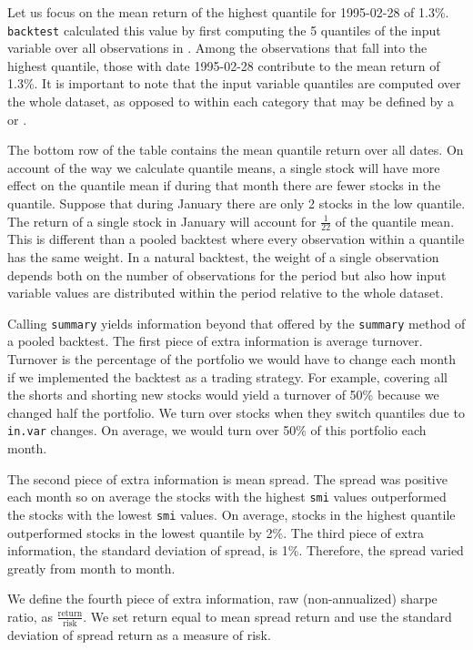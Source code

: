 \documentclass[a4paper]{report}
\begin{document}
\begin{article}
Let us focus on the mean return of the highest quantile for 1995-02-28
of 1.3\%.  \texttt{backtest} calculated this value by first computing
the 5 quantiles of the input variable  over all observations
in .  Among the observations that fall into the highest
quantile, those with date 1995-02-28 contribute to the mean return of
1.3\%.  It is important to note that the input variable quantiles are
computed over the whole dataset, as opposed to within each category
that may be defined by a  or .

The bottom row of the table contains the mean quantile return over all
dates.  On account of the way we calculate quantile means, a single
stock will have more effect on the quantile mean if during that month
there are fewer stocks in the quantile.  Suppose that during January
there are only 2 stocks in the low quantile.  The return of a single
stock in January will account for $\frac{1}{22}$ of the quantile mean.
This is different than a pooled backtest where every observation
within a quantile has the same weight.  In a natural backtest, the
weight of a single observation depends both on the number of
observations for the period but also how input variable values are
distributed within the period relative to the whole dataset.

Calling \texttt{summary} yields information beyond that offered by the
\texttt{summary} method of a pooled backtest.  The first piece of
extra information is average turnover.  Turnover is the percentage
of the portfolio we would have to change each month if we implemented
the backtest as a trading strategy.  For example, covering all the
shorts and shorting new stocks would yield a turnover of 50\% because
we changed half the portfolio.  We turn over stocks when they switch
quantiles due to \texttt{in.var} changes.  On average, we would turn
over 50\% of this portfolio each month.

The second piece of extra information is mean spread.  The spread was
positive each month so on average the stocks with the highest
\texttt{smi} values outperformed the stocks with the lowest
\texttt{smi} values.  On average, stocks in the highest quantile
outperformed stocks in the lowest quantile by 2\%.  The third piece of
extra information, the standard deviation of spread, is 1\%.
Therefore, the spread varied greatly from month to month.

We define the fourth piece of extra information, raw (non-annualized)
sharpe ratio, as $\frac{\textrm{return}}{\textrm{risk}}$. We set
return equal to mean spread return and use the standard deviation of
spread return as a measure of risk.


\end{article}
\end{document}
